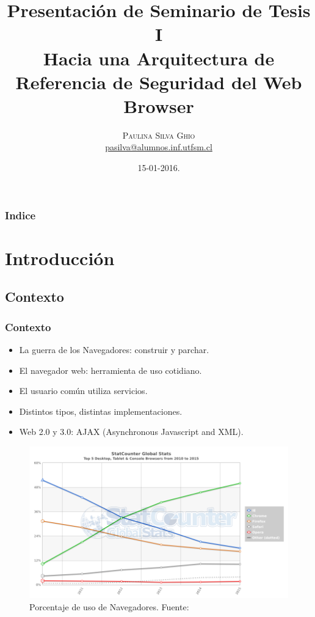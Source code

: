 \documentclass[serif,9pt]{beamer}
\begin{document}
\title{Presentación de Seminario de Tesis I\\ Hacia una Arquitectura de Referencia de Seguridad del Web Browser} 
\author[Paulina Silva Ghio]{\textsc{Paulina Silva Ghio} \\ \medskip
\small{}
\medskip
\url{pasilva@alumnos.inf.utfsm.cl}}
\institute[]{}
\date{15-01-2016.}

\begin{frame}[plain]
\titlepage
\end{frame}


\begin{frame}
\frametitle{Indice}
\tableofcontents
\end{frame} 


\section{Introducci\'on}
\subsection{Contexto}
\begin{frame}
	\frametitle{Contexto}

	\begin{itemize}
		\item La guerra de los Navegadores: construir y parchar.
		\item El navegador web: herramienta de uso cotidiano.
		\item El usuario com\'un utiliza servicios.
		\item Distintos tipos, distintas implementaciones.
		\item Web 2.0 y 3.0: AJAX (Asynchronous Javascript and XML).
	\end{itemize}
	\begin{figure}[h]
	    \centering
	    \includegraphics[scale=0.3]{figures/StatCounter-browser-ww-yearly-2010-2015.png}
	    \caption{Porcentaje de uso de Navegadores. Fuente: \cite{statBrow}}
	    \label{fig:UsageShare}
	\end{figure}
\end{frame}
\end{document}
